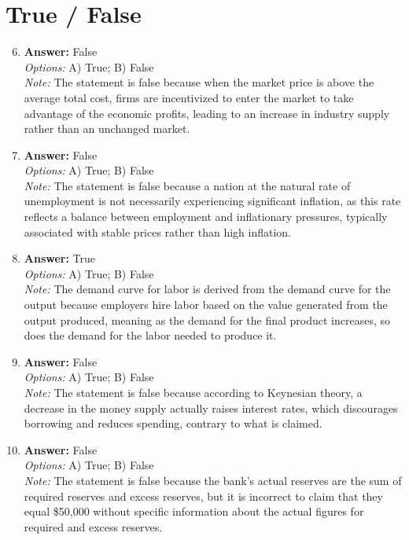 \documentclass[12pt]{article}
\begin{document}
\section*{True / False}
\begin{enumerate}[label=\arabic*.]
\setcounter{enumi}{5}
\item \textbf{Answer:} False
\\ \textit{Options:} A) True; B) False
\\ \textit{Note:} The statement is false because when the market price is above the average total cost, firms are incentivized to enter the market to take advantage of the economic profits, leading to an increase in industry supply rather than an unchanged market.
\item \textbf{Answer:} False
\\ \textit{Options:} A) True; B) False
\\ \textit{Note:} The statement is false because a nation at the natural rate of unemployment is not necessarily experiencing significant inflation, as this rate reflects a balance between employment and inflationary pressures, typically associated with stable prices rather than high inflation.
\item \textbf{Answer:} True
\\ \textit{Options:} A) True; B) False
\\ \textit{Note:} The demand curve for labor is derived from the demand curve for the output because employers hire labor based on the value generated from the output produced, meaning as the demand for the final product increases, so does the demand for the labor needed to produce it.
\item \textbf{Answer:} False
\\ \textit{Options:} A) True; B) False
\\ \textit{Note:} The statement is false because according to Keynesian theory, a decrease in the money supply actually raises interest rates, which discourages borrowing and reduces spending, contrary to what is claimed.
\item \textbf{Answer:} False
\\ \textit{Options:} A) True; B) False
\\ \textit{Note:} The statement is false because the bank's actual reserves are the sum of required reserves and excess reserves, but it is incorrect to claim that they equal \$50,000 without specific information about the actual figures for required and excess reserves.
\end{enumerate}
\end{document}
